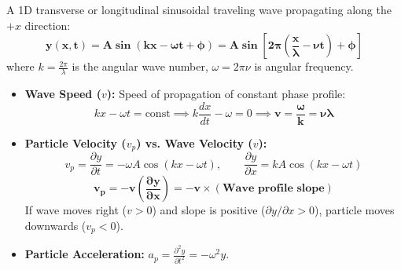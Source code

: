 \documentclass[10pt,twoside,openright]{book}
\begin{document}
\begin{conceptbox}
A 1D transverse or longitudinal sinusoidal traveling wave propagating along the $+x$ direction:
\begin{equation}
  \mathbf{y(x,t) = A \sin(k x - \omega t + \phi) = A \sin\left[2\pi\left(\frac{x}{\lambda} - \nu t\right) + \phi\right]}
\end{equation}
where $k = \frac{2\pi}{\lambda}$ is the angular wave number, $\omega = 2\pi\nu$ is angular frequency.
\begin{itemize}
  \item \textbf{Wave Speed ($v$):} Speed of propagation of constant phase profile:
  \begin{equation}
    k x - \omega t = \text{const} \implies k \frac{dx}{dt} - \omega = 0 \implies \mathbf{v = \frac{\omega}{k} = \nu \lambda}
  \end{equation}
  \item \textbf{Particle Velocity ($v_p$) vs. Wave Velocity ($v$):}
  \begin{equation}
    v_p = \frac{\partial y}{\partial t} = -\omega A \cos(k x - \omega t), \qquad \frac{\partial y}{\partial x} = k A \cos(k x - \omega t)
  \end{equation}
  \begin{equation}
    \mathbf{v_p = -v \left(\frac{\partial y}{\partial x}\right) = -v \times (\text{Wave profile slope})}
  \end{equation}
  If wave moves right ($v>0$) and slope is positive ($\partial y/\partial x > 0$), particle moves downwards ($v_p < 0$).
  \item \textbf{Particle Acceleration:} $a_p = \frac{\partial^2 y}{\partial t^2} = -\omega^2 y$.
\end{itemize}
\end{conceptbox}
\end{document}
